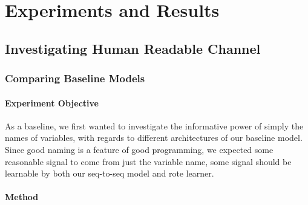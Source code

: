 \chapter{Experiments and Results}
\label{experiments_and_results}

\section{Investigating Human Readable Channel} %
\label{sec:investigating_human_readable_channel}

\subsection{Comparing Baseline Models} %
\label{sub:comparing_baseline_models}

\subsubsection{Experiment Objective} %

As a baseline, we first wanted to investigate the informative power of simply the names of variables, with regards to different architectures of our baseline model.
Since good naming is a feature of good programming, we expected some reasonable signal to come from just the variable name, some signal should be learnable by both our seq-to-seq model and rote learner.

\subsubsection{Method} %

